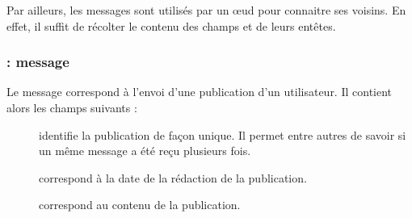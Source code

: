 Par ailleurs, les messages \msgheartbeat{} sont utilisés par un \oe ud pour connaitre ses voisins.
En effet, il suffit de récolter le contenu des champs \fkfrom{} et \fknick{} de leurs entêtes.

\format{\foffers \apgdelim \fdemands}

\formatvar{\fvoffers}{\\\fvnodeid-\fvpriority,\fvnodeid-\fvpriority,\ldots}

\formatvar{\fvdemands}{\\\fvnodeid-\fvpriority,\fvnodeid-\fvpriority,\ldots}


\subsubsection{\Payload : message \msgpie}

Le message \msgpie{} correspond à l'envoi d'une publication d'un utilisateur.
Il contient alors les champs suivants :

\begin{description}
	\item[\fkmsgid] identifie la publication de façon unique. Il permet entre autres de savoir si un même message a été reçu plusieurs fois.
	\item[\fkmsgdate] correspond à la date de la rédaction de la publication.
	\item[\fkmsgcontent] correspond au contenu de la publication.
\end{description}

\format{\fmsgid \apgdelim \fmsgdate \apgdelim \fmsgcontent}

